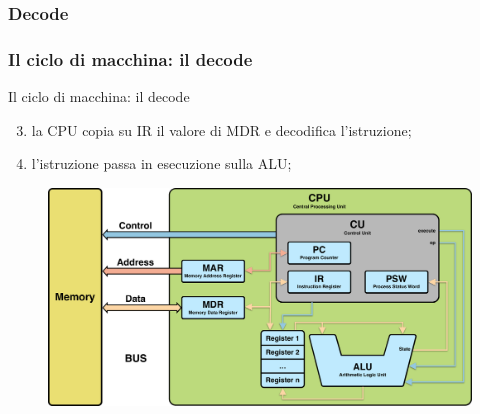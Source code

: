 \subsubsection[Decode]{Decode}
\begin{frame}
	\frametitle{Il ciclo di macchina: il {\color{CpuRed}\textbf{decode}}}
	
	\begin{block}{Il ciclo di macchina: il decode}	
	
		\begin{enumerate}
			\setcounter{enumi}{2}
			\item la CPU copia su IR il valore di MDR e decodifica l'istruzione;
			\item l'istruzione passa in esecuzione sulla ALU;
		\end{enumerate}
	
	\end{block}
	
	\begin{figure}[!htbp] 
		\centering
		\includegraphics[width=0.7\linewidth]{images/4_cpu/architecture_cpu_complex.pdf}
		\label{fig:cpu_complex}
	\end{figure}
	
\end{frame}

